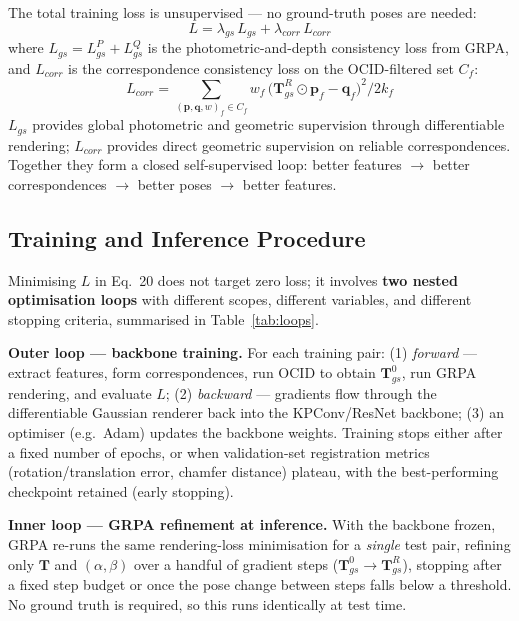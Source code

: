 \documentclass[11pt,a4paper]{article}
\begin{document}
The total training loss is unsupervised — no ground-truth poses are needed:
\begin{equation}
  L = \lambda_{gs}\, L_{gs} + \lambda_{corr}\, L_{corr}
  \tag{20}
\end{equation}
where $L_{gs} = L^P_{gs} + L^Q_{gs}$ is the photometric-and-depth consistency loss from
GRPA, and $L_{corr}$ is the correspondence consistency loss on the OCID-filtered set $C_f$:
\begin{equation}
  L_{corr} = \sum_{(\mathbf{p},\mathbf{q},w)_f \in C_f}
  w_f\,\bigl(\mathbf{T}_{gs}^R \odot \mathbf{p}_f - \mathbf{q}_f\bigr)^2 \big/ 2k_f
  \tag{21}
\end{equation}
$L_{gs}$ provides global photometric and geometric supervision through differentiable
rendering; $L_{corr}$ provides direct geometric supervision on reliable correspondences.
Together they form a closed self-supervised loop: better features $\to$ better
correspondences $\to$ better poses $\to$ better features.

\subsection{Training and Inference Procedure}
\label{sec:training}

Minimising $L$ in Eq.~20 does not target zero loss; it involves \textbf{two nested
optimisation loops} with different scopes, different variables, and different stopping
criteria, summarised in Table~\ref{tab:loops}.

\textbf{Outer loop — backbone training.} For each training pair: (1) \emph{forward} —
extract features, form correspondences, run OCID to obtain $\mathbf{T}_{gs}^0$, run GRPA
rendering, and evaluate $L$; (2) \emph{backward} — gradients flow through the
differentiable Gaussian renderer back into the KPConv/ResNet backbone; (3) an optimiser
(e.g.\ Adam) updates the backbone weights. Training stops either after a fixed number of
epochs, or when validation-set registration metrics (rotation/translation error, chamfer
distance) plateau, with the best-performing checkpoint retained (early stopping).

\textbf{Inner loop — GRPA refinement at inference.} With the backbone frozen, GRPA
re-runs the same rendering-loss minimisation for a \emph{single} test pair, refining only
$\mathbf{T}$ and $(\alpha,\beta)$ over a handful of gradient steps
($\mathbf{T}_{gs}^0 \to \mathbf{T}_{gs}^R$), stopping after a fixed step budget or once the
pose change between steps falls below a threshold. No ground truth is required, so this
runs identically at test time.
\end{document}
